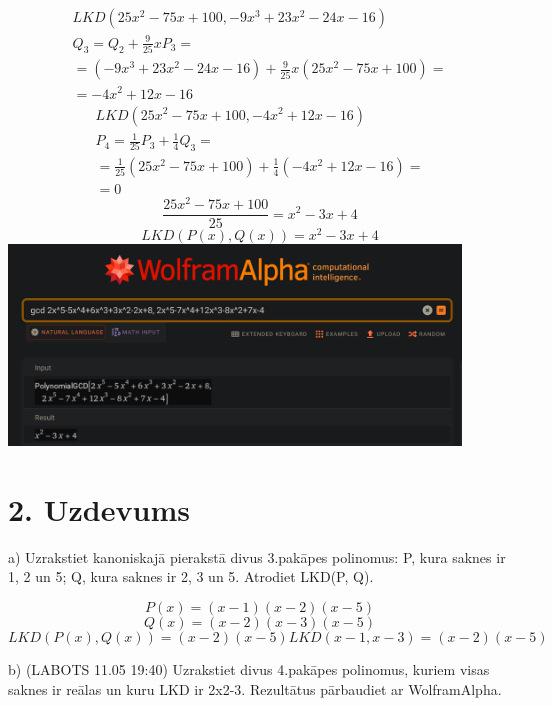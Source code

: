 \documentclass{article}
\begin{document}
\begin{gather*}
    LKD(25x^2-75x+100, -9x^3+23x^2-24x-16) \\
    Q_3 = Q_2 + \frac{9}{25}xP_3 = \\ = (-9x^3+23x^2-24x-16) + \frac{9}{25}x(25x^2-75x+100) = \\ = -4x^2+12x-16
\end{gather*}
\begin{gather*}
    LKD(25x^2-75x+100, -4x^2+12x-16) \\
    P_4 = \frac{1}{25}P_3 + \frac{1}{4}Q_3 = \\ = \frac{1}{25}(25x^2-75x+100) + \frac{1}{4}(-4x^2+12x-16) = \\ = 0
\end{gather*}
\begin{equation*}
    \frac{25x^2-75x+100}{25} = x^2-3x+4
\end{equation*}
\begin{equation*}
    LKD(P(x), Q(x)) = x^2-3x+4
\end{equation*}
\includegraphics[width=0.9\textwidth, center]{1.png}

\section*{2. Uzdevums}
a) Uzrakstiet kanoniskajā pierakstā divus 3.pakāpes polinomus: P, kura saknes ir 1, 2 un 5; Q, kura saknes ir 2, 3 un 5.  Atrodiet LKD(P, Q).

\begin{equation*}
    P(x) = (x-1)(x-2)(x-5)
\end{equation*}
\begin{equation*}
    Q(x) = (x-2)(x-3)(x-5)
\end{equation*}
\begin{equation*}
    LKD(P(x), Q(x)) = (x-2)(x-5)LKD(x-1, x-3) = (x-2)(x-5)
\end{equation*}

b) (LABOTS 11.05 19:40) Uzrakstiet divus 4.pakāpes polinomus, kuriem visas saknes ir reālas un kuru LKD ir 2x2-3. Rezultātus pārbaudiet ar WolframAlpha.
\end{document}
